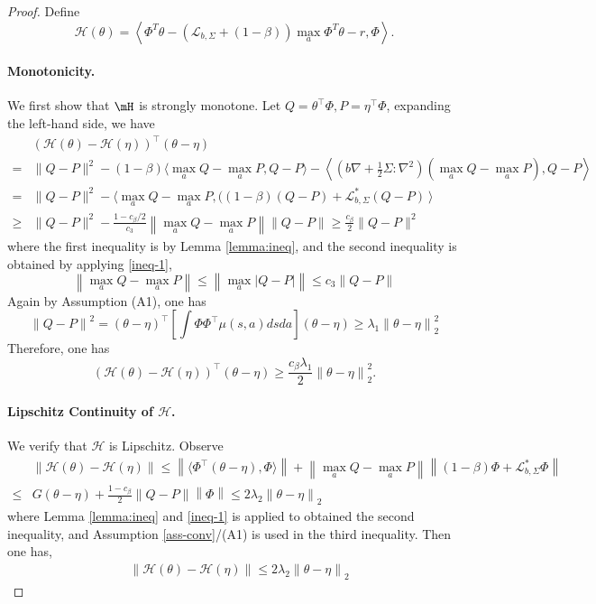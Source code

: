 \documentclass[12pt]{article}
\def\lam{\lambda}
\def\th{\theta}
\def\th{\theta}
\def\mL{\mathcal{L}_{b,\Sigma}}
\def\l{\left}
\def\r{\right}
\def\la{\left\langle}
\def\ra{\right\rangle}
\def\ll{\left\lVert}
\def\rl{\right\rVert}
\begin{document}
\iffalse
\begin{proof}
Define
\begin{equation}
        \mathcal{H}(\theta) = \left\langle \Phi^T \theta - (\mathcal{L}_{b,\Sigma} + (1-\beta)) \max_a \Phi^T \theta - r, \Phi \right\rangle.
\end{equation}   
\paragraph{Monotonicity.}
We first show that $\mH$ is strongly monotone. 
Let $Q = \th^\top\Phi, P = \eta^\top \Phi$, expanding the left-hand side, we have
\begin{align*}
&\l(\mathcal{H}(\theta) -  \mathcal{H}(\eta) \r)^\top (\theta - \eta)\\
= &\|Q-P\|^2 - (1-\beta)\langle \max_a Q - \max_a P, Q-P \rangle - \la (b \nabla + \frac{1}{2} \Sigma: \nabla^2)(\max_a Q - \max_a P), Q-P \ra\\
=&\|Q-P\|^2 - \langle \max_a Q - \max_a P, ( (1-\beta) (Q-P) +\mL^*(Q-P) \ \rangle \\
\geq& \|Q-P\|^2 -\frac{1-c_\beta/2}{c_3}\ll\max_a Q - \max_a P\rl \ll Q - P \rl  \geq \frac{c_\beta}2\|Q-P\|^2
\end{align*}
where the first inequality is by Lemma \ref{lemma:ineq}, and the second inequality is obtained by applying \eqref{ineq-1}, 
\[
\ll\max_a Q - \max_a P\rl \leq \ll \max_a |Q - P| \rl \leq c_3\ll Q - P \rl
\]
Again by Assumption (A1), one has
\[
\ll Q - P \rl^2 = (\th - \eta)^\top\l[\int\Phi\Phi^\top \mu(s,a)dsda\r](\th - \eta) \geq \lam_1\ll \th - \eta \rl_2^2 
\]
Therefore, one has
\[
\l(\mathcal{H}(\theta) -  \mathcal{H}(\eta) \r)^\top (\theta - \eta) \geq \frac{c_\beta\lam_1}{2}\ll \th - \eta\rl_2^2.
\]

\paragraph{Lipschitz Continuity of $ \mathcal{H} $.}
We verify that $ \mathcal{H} $ is Lipschitz. Observe
\begin{align*}
&\|\mathcal{H}(\theta) - \mathcal{H}(\eta)\| 
\leq \ll \langle \Phi^\top (\theta-\eta), \Phi \rangle\rl + \ll  \max_aQ - \max_a P \rl \ll (1-\beta)\Phi + \mL^*\Phi \rl\\
\leq & G(\th - \eta) + \frac{1-c_\beta}{2} \ll Q - P \rl\ll \Phi\rl 
\leq 2\lam_2 \ll \th - \eta \rl_2 
\end{align*}
where Lemma \ref{lemma:ineq} and \eqref{ineq-1} is applied to obtained the second inequality, and Assumption \ref{ass-conv}/(A1) is used in the third inequality. Then one has, 
\begin{align*}
&\|\mathcal{H}(\theta) - \mathcal{H}(\eta)\| 
\leq 2\lam_2\ll \th - \eta \rl_2
\end{align*}


\end{proof}
\end{document}
